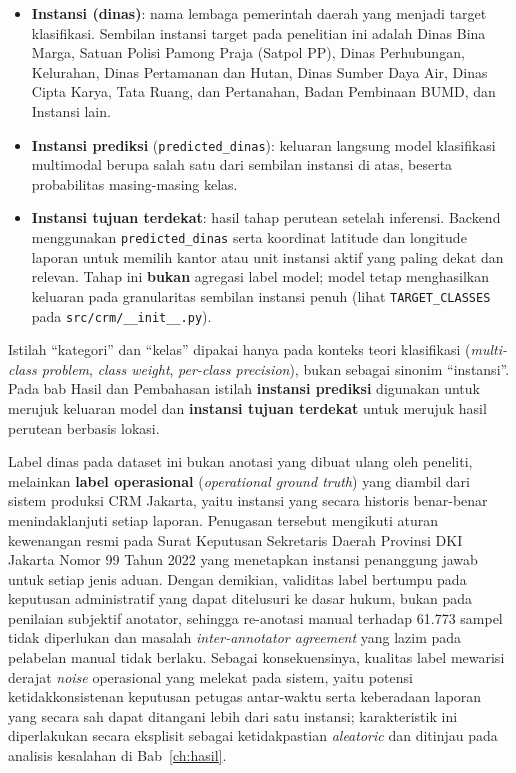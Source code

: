\begin{itemize}
    \item \textbf{Instansi (dinas)}: nama lembaga pemerintah daerah yang menjadi target klasifikasi. Sembilan instansi target pada penelitian ini adalah Dinas Bina Marga, Satuan Polisi Pamong Praja (Satpol PP), Dinas Perhubungan, Kelurahan, Dinas Pertamanan dan Hutan, Dinas Sumber Daya Air, Dinas Cipta Karya, Tata Ruang, dan Pertanahan, Badan Pembinaan BUMD, dan Instansi lain.
    \item \textbf{Instansi prediksi} (\texttt{predicted\_dinas}): keluaran langsung model klasifikasi multimodal berupa salah satu dari sembilan instansi di atas, beserta probabilitas masing-masing kelas.
    \item \textbf{Instansi tujuan terdekat}: hasil tahap perutean setelah inferensi. Backend menggunakan \texttt{predicted\_dinas} serta koordinat latitude dan longitude laporan untuk memilih kantor atau unit instansi aktif yang paling dekat dan relevan. Tahap ini \textbf{bukan} agregasi label model; model tetap menghasilkan keluaran pada granularitas sembilan instansi penuh (lihat \texttt{TARGET\_CLASSES} pada \texttt{src/crm/\_\_init\_\_.py}).
\end{itemize}

Istilah ``kategori'' dan ``kelas'' dipakai hanya pada konteks teori klasifikasi (\textit{multi-class problem}, \textit{class weight}, \textit{per-class precision}), bukan sebagai sinonim ``instansi''. Pada bab Hasil dan Pembahasan istilah \textbf{instansi prediksi} digunakan untuk merujuk keluaran model dan \textbf{instansi tujuan terdekat} untuk merujuk hasil perutean berbasis lokasi.

Label dinas pada dataset ini bukan anotasi yang dibuat ulang oleh peneliti, melainkan \textbf{label operasional} (\textit{operational ground truth}) yang diambil dari sistem produksi CRM Jakarta, yaitu instansi yang secara historis benar-benar menindaklanjuti setiap laporan. Penugasan tersebut mengikuti aturan kewenangan resmi pada Surat Keputusan Sekretaris Daerah Provinsi DKI Jakarta Nomor 99 Tahun 2022 yang menetapkan instansi penanggung jawab untuk setiap jenis aduan. Dengan demikian, validitas label bertumpu pada keputusan administratif yang dapat ditelusuri ke dasar hukum, bukan pada penilaian subjektif anotator, sehingga re-anotasi manual terhadap 61.773 sampel tidak diperlukan dan masalah \textit{inter-annotator agreement} yang lazim pada pelabelan manual tidak berlaku. Sebagai konsekuensinya, kualitas label mewarisi derajat \textit{noise} operasional yang melekat pada sistem, yaitu potensi ketidakkonsistenan keputusan petugas antar-waktu serta keberadaan laporan yang secara sah dapat ditangani lebih dari satu instansi; karakteristik ini diperlakukan secara eksplisit sebagai ketidakpastian \textit{aleatoric} dan ditinjau pada analisis kesalahan di Bab~\ref{ch:hasil}.

